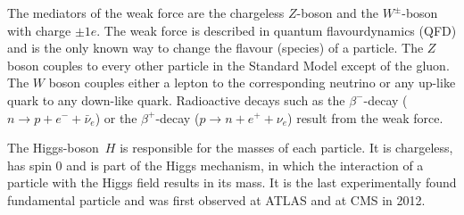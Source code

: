 The mediators of the weak force are the chargeless $Z$-boson and the $W^\pm$-boson with charge $\pm 1e$.
The weak force is described in quantum flavourdynamics (QFD) and is the only known way to change the flavour (species) of a particle.
The $Z$ boson couples to every other particle in the Standard Model except of the gluon.
The $W$ boson couples either a lepton to the corresponding neutrino or any up-like quark to any down-like quark.
Radioactive decays such as the $\beta^-$-decay ($n \rightarrow p + e^- + \bar{\nu}_e$) or the $\beta^+$-decay ($p \rightarrow n + e^+ + \nu_e$) result from the weak force.

The Higgs-boson~$H$ is responsible for the masses of each particle.
It is chargeless, has spin $0$ and is part of the Higgs mechanism, in which the interaction of a particle with the Higgs field results in its mass.
It is the last experimentally found fundamental particle and was first observed at ATLAS and at CMS in 2012. \cite{HiggsATLAS,HiggsCMS}
